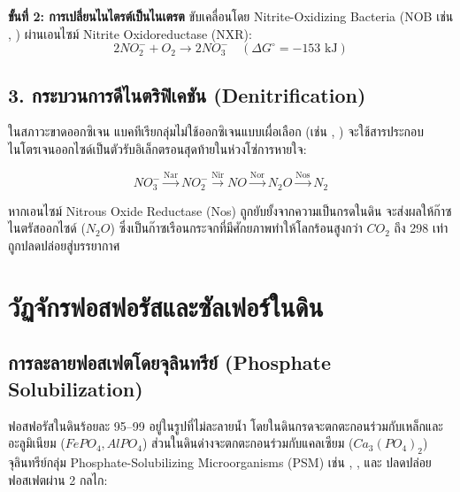 \textbf{ขั้นที่ 2: การเปลี่ยนไนไตรต์เป็นไนเตรต} ขับเคลื่อนโดย Nitrite-Oxidizing Bacteria (NOB เช่น , ) ผ่านเอนไซม์ Nitrite Oxidoreductase (NXR):
\begin{equation}
2NO_2^- + O_2 \rightarrow 2NO_3^- \quad (\Delta G^\circ = -153\text{ kJ})
\end{equation}

\subsection{3. กระบวนการดีไนตริฟิเคชัน (Denitrification)}

ในสภาวะขาดออกซิเจน แบคทีเรียกลุ่มไม่ใช้ออกซิเจนแบบเผื่อเลือก (เช่น , ) จะใช้สารประกอบไนโตรเจนออกไซด์เป็นตัวรับอิเล็กตรอนสุดท้ายในห่วงโซ่การหายใจ:

\begin{equation}
NO_3^- \xrightarrow{\text{Nar}} NO_2^- \xrightarrow{\text{Nir}} NO \xrightarrow{\text{Nor}} N_2O \xrightarrow{\text{Nos}} N_2
\end{equation}

หากเอนไซม์ Nitrous Oxide Reductase (Nos) ถูกยับยั้งจากความเป็นกรดในดิน จะส่งผลให้ก๊าซไนตรัสออกไซด์ ($N_2O$) ซึ่งเป็นก๊าซเรือนกระจกที่มีศักยภาพทำให้โลกร้อนสูงกว่า $CO_2$ ถึง 298 เท่า ถูกปลดปล่อยสู่บรรยากาศ

\section{วัฏจักรฟอสฟอรัสและซัลเฟอร์ในดิน}

\subsection{การละลายฟอสเฟตโดยจุลินทรีย์ (Phosphate Solubilization)}

ฟอสฟอรัสในดินร้อยละ 95--99 อยู่ในรูปที่ไม่ละลายน้ำ โดยในดินกรดจะตกตะกอนร่วมกับเหล็กและอะลูมิเนียม ($FePO_4, AlPO_4$) ส่วนในดินด่างจะตกตะกอนร่วมกับแคลเซียม ($Ca_3(PO_4)_2$) จุลินทรีย์กลุ่ม Phosphate-Solubilizing Microorganisms (PSM) เช่น , , และ  ปลดปล่อยฟอสเฟตผ่าน 2 กลไก:


